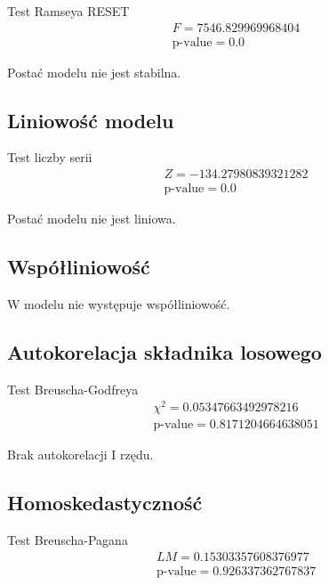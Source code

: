 Test Ramseya RESET
\begin{equation}
    \begin{split}
        &F = 7546.829969968404 \\ &\text{p-value} = 0.0
    \end{split}
\end{equation}

Postać modelu nie jest stabilna.

\subsection{Liniowość modelu}\label{subsec:liniowosc-modelu}
Test liczby serii
\begin{equation}
    \begin{split}
        &Z = -134.27980839321282 \\ &\text{p-value} = 0.0
    \end{split}
\end{equation}

Postać modelu nie jest liniowa.

\subsection{Współliniowość}\label{subsec:współliniowość}

W modelu nie występuje współliniowość.

\subsection{Autokorelacja składnika losowego}\label{subsec:autokorelacja-składnika-losowego2}
Test Breuscha-Godfreya
\begin{equation}
    \begin{split}
        &\chi^{2}= 0.05347663492978216 \\ &\text{p-value} =0.8171204664638051
    \end{split}
\end{equation}

Brak autokorelacji I rzędu.

\subsection{Homoskedastyczność}\label{subsec:homoskedastyczność}
Test Breuscha-Pagana
\begin{equation}
    \begin{split}
        &LM=0.15303357608376977 \\  &\text{p-value} = 0.926337362767837
    \end{split}
\end{equation}

